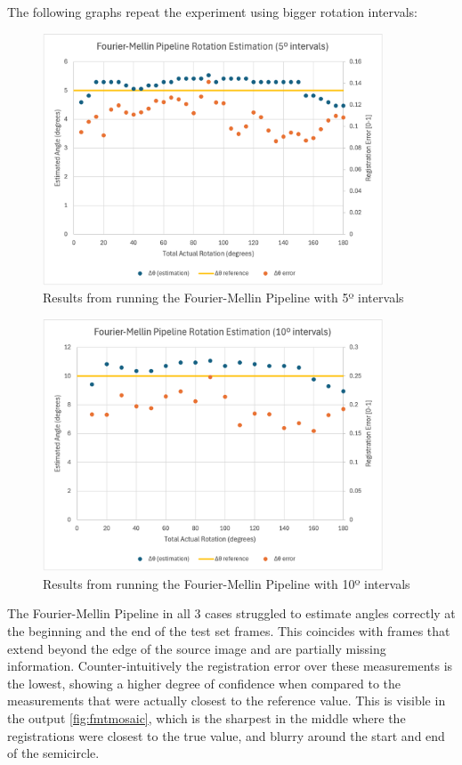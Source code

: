The following graphs repeat the experiment using bigger rotation intervals:

\begin{figure}[H]
  \centering
  \includegraphics[width=0.9\textwidth]{figures/results/Rotation-Graphs/FMT-5.png}
  \caption{Results from running the Fourier-Mellin Pipeline with 5º intervals}
\end{figure}

\begin{figure}[H]
  \centering
  \includegraphics[width=0.9\textwidth]{figures/results/Rotation-Graphs/FMT-10.png}
  \caption{Results from running the Fourier-Mellin Pipeline with 10º intervals}
\end{figure}

The Fourier-Mellin Pipeline in all 3 cases struggled to estimate angles correctly at the beginning and the end of the test set frames. This coincides with frames that extend beyond the edge of the source image and are partially missing information. Counter-intuitively the registration error over these measurements is the lowest, showing a higher degree of confidence when compared to the measurements that were actually closest to the reference value. This is visible in the output \autoref{fig:fmtmosaic}, which is the sharpest in the middle where the registrations were closest to the true value, and blurry around the start and end of the semicircle.

